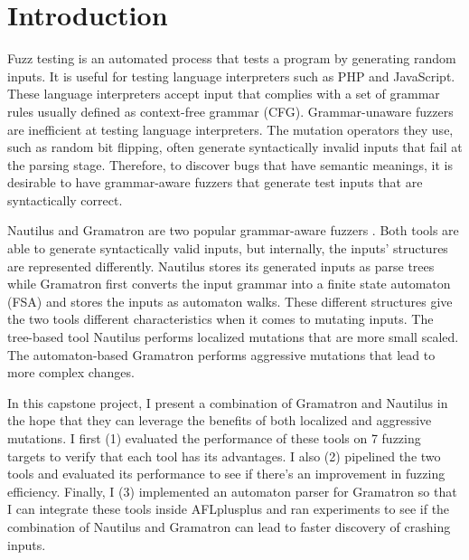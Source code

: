 \section{Introduction}
\label{sec:intro}
Fuzz testing is an automated process that tests a program by generating random inputs. It is useful for testing language interpreters such as PHP and JavaScript. These language interpreters accept input that complies with a set of grammar rules usually defined as context-free grammar (CFG). Grammar-unaware fuzzers are inefficient at testing language interpreters. The mutation operators they use, such as random bit flipping, often generate syntactically invalid inputs that fail at the parsing stage. Therefore, to discover bugs that have semantic meanings, it is desirable to have grammar-aware fuzzers that generate test inputs that are syntactically correct.

Nautilus and Gramatron are two popular grammar-aware fuzzers \cite{srivastava_payer_2021, aschermann_frassetto_holz_jauernig_sadeghi_teuchert_2019}. Both tools are able to generate syntactically valid inputs, but internally, the inputs' structures are represented differently. Nautilus stores its generated inputs as parse trees while Gramatron first converts the input grammar into a finite state automaton (FSA) and stores the inputs as automaton walks. These different structures give the two tools different characteristics when it comes to mutating inputs. The tree-based tool Nautilus performs localized mutations that are more small scaled. The automaton-based Gramatron performs aggressive mutations that lead to more complex changes. 

In this capstone project, I present a combination of Gramatron and Nautilus in the hope that they can leverage the benefits of both localized and aggressive mutations. I first (1) evaluated the performance of these tools on 7 fuzzing targets to verify that each tool has its advantages. I also (2) pipelined the two tools and evaluated its performance to see if there's an improvement in fuzzing efficiency. Finally, I (3) implemented an automaton parser for Gramatron so that I can integrate these tools inside AFLplusplus and ran experiments to see if the combination of Nautilus and Gramatron can lead to faster discovery of crashing inputs. 






